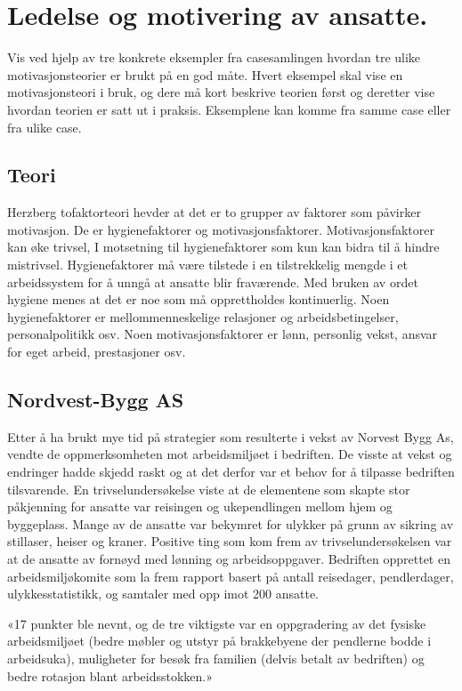 \documentclass[11]{article}
\begin{document}
\newpage
\section{Ledelse og motivering av ansatte.}

Vis ved hjelp av tre konkrete eksempler fra
casesamlingen hvordan tre ulike motivasjonsteorier er brukt på en god måte. Hvert eksempel
skal vise en motivasjonsteori i bruk, og dere må kort beskrive teorien først og deretter vise
hvordan teorien er satt ut i praksis. Eksemplene kan komme fra samme case eller fra ulike
case.

\subsection{Teori}


Herzberg tofaktorteori hevder at det er to grupper av faktorer som påvirker motivasjon. De er hygienefaktorer og motivasjonsfaktorer. Motivasjonsfaktorer kan øke trivsel, I motsetning til hygienefaktorer som kun kan bidra til å hindre mistrivsel. Hygienefaktorer må være tilstede i en tilstrekkelig mengde i et arbeidssystem for å unngå at ansatte blir fraværende. Med bruken av ordet hygiene menes at det er noe som må opprettholdes kontinuerlig. Noen hygienefaktorer er mellommenneskelige relasjoner og arbeidsbetingelser, personalpolitikk osv. Noen motivasjonsfaktorer er lønn, personlig vekst, ansvar for eget arbeid, prestasjoner osv. 

\subsection{Nordvest-Bygg AS}

Etter å ha brukt mye tid på strategier som resulterte i vekst av Norvest Bygg As, vendte de oppmerksomheten mot arbeidsmiljøet i bedriften. De visste at vekst og endringer hadde skjedd raskt og at det derfor var et behov for å tilpasse bedriften tilsvarende. En trivselundersøkelse viste at de elementene som skapte stor påkjenning for ansatte var reisingen og ukependlingen mellom hjem og byggeplass. Mange av de ansatte var bekymret for ulykker på grunn av sikring av stillaser, heiser og kraner. Positive ting som kom frem av trivselundersøkelsen var at de ansatte av fornøyd med lønning og arbeidsoppgaver. Bedriften opprettet en arbeidsmiljøkomite som la frem rapport basert på antall reisedager, pendlerdager, ulykkesstatistikk, og samtaler med opp imot 200 ansatte. 

«17 punkter ble nevnt, og de tre viktigste var en oppgradering av det fysiske arbeidsmiljøet (bedre møbler og utstyr på brakkebyene der pendlerne bodde i arbeidsuka), muligheter for besøk fra familien (delvis betalt av bedriften) og bedre rotasjon blant arbeidsstokken.»
\end{document}
